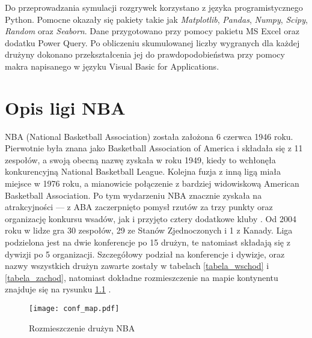 \documentclass[inzynierska]{pwr_wmat_praca_dyplomowa}
\theoremstyle{plain}
\numberwithin{theorem}{chapter}
\theoremstyle{definition}
\numberwithin{theorem}{chapter}
\begin{document}
\hspace*{6mm}Do przeprowadzania symulacji rozgrywek korzystano z języka programistycznego Python. Pomocne okazały się pakiety takie jak \textit{Matplotlib}, \textit{Pandas}, \textit{Numpy}, \textit{Scipy}, \textit{Random} oraz \textit{Seaborn}. Dane przygotowano przy pomocy pakietu MS Excel oraz dodatku Power Query. Po obliczeniu skumulowanej liczby wygranych dla każdej drużyny dokonano przekształcenia jej do prawdopodobieństwa przy pomocy makra napisanego w języku Visual Basic for Applications.


\chapter{Opis ligi NBA}\label{rodzial1}
NBA (National Basketball Association) została założona 6 czerwca 1946 roku. Pierwotnie była znana jako Basketball Association of America i składała się z 11 zespołów, a swoją obecną nazwę zyskała w roku 1949, kiedy to wchłonęła konkurencyjną National Basketball League. Kolejna fuzja z inną ligą miała miejsce w 1976 roku, a mianowicie połączenie z bardziej widowiskową American Basketball Association. Po tym wydarzeniu NBA znacznie zyskała na atrakcyjności --- z ABA zaczerpnięto pomysł rzutów za trzy punkty oraz organizację konkursu wsadów, jak i przyjęto cztery dodatkowe kluby \cite{history}. Od 2004 roku w lidze gra 30 zespołów, 29 ze Stanów Zjednoczonych i 1 z Kanady. Liga podzielona jest na dwie konferencje po 15 drużyn, te natomiast składają się z dywizji po 5 organizacji. Szczegółowy podział na konferencje i dywizje, oraz nazwy wszystkich drużyn zawarte zostały w tabelach \ref{tabela_wschod} i \ref{tabela_zachod}, natomiast dokładne rozmieszczenie na mapie kontynentu znajduje się na rysunku \ref{mapa_stany} \cite{mapa}.

\begin{figure}[t]
	\texttt{[image: conf\_map.pdf]}
	\caption{Rozmieszczenie drużyn NBA \cite{mapa}}\label{mapa_stany}
	\centering
\end{figure}
\end{document}
